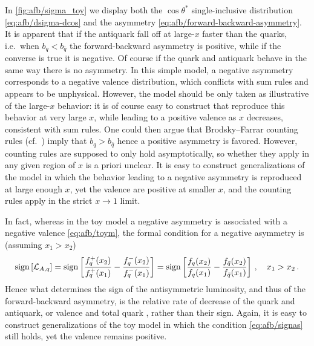 In \cref{fig:afb/sigma_toy} we display both the $\cos\theta^*$ single-inclusive
distribution \cref{eq:afb/dsigma-dcos} and the asymmetry
\cref{eq:afb/forward-backward-asymmetry}.
%
It is apparent that if the  antiquark \pdfs fall off at large-$x$ faster than
the quarks, i.e.\ when $b_q < b_{\bar{q}}$ the forward-backward asymmetry is
positive, while if the converse is true it is negative.
Of course if the quark and antiquark \pdfs behave in the same way there is no
asymmetry.
%
In this simple model, a negative asymmetry corresponds to a negative valence
distribution, which conflicts with sum rules and appears to be unphysical.
However, the model should be only taken as illustrative of the large-$x$
behavior: it is of course easy to construct \pdfs that reproduce this behavior
at very large $x$, while leading to a positive valence \pdf as $x$ decreases,
consistent with sum rules. 
One could then argue that Brodsky--Farrar counting rules (cf.\ 
\cite{Brodsky:1973kr,Brodsky:1974vy}) imply that  $b_q > b_{\bar{q}}$ hence a
positive asymmetry is favored.
%
However, counting rules are supposed to only hold asymptotically, so whether
they apply in any given region of $x$ is a priori unclear.
%
It is easy to construct generalizations of the model in which the behavior
leading to a negative asymmetry is reproduced at large enough $x$, yet the
valence \pdfs are positive at smaller $x$, and the counting rules apply in the
strict $x\to1$ limit.

In fact, whereas in the toy model a negative asymmetry is associated with a
negative valence \cref{eq:afb/toym}, the formal condition for a negative
asymmetry is (assuming $x_1>x_2$)
\begin{equation}\label{eq:afb/signas}
   \operatorname{sign}\left[\mathcal{L}_{A,q}\right]=\operatorname{sign}\left[\frac{ f_q^+(x_2)}{
       f_q^+(x_1)}-\frac{
       f_q^-(x_2)}{f_q^-(x_1)}\right]=\operatorname{sign}\left[\frac{ f_q(x_2)}{
       f_q(x_1)}-\frac{f_{\bar{q}}(x_2)}{f_{\bar{q}}(x_1)}\right] \, , \quad x_1>x_2 \,.
\end{equation}
Hence what determines the sign of the antisymmetric luminosity, and thus of the
forward-backward asymmetry, is the relative rate of decrease of the quark and
antiquark, or valence and total quark \pdfs, rather than their sign.
Again, it is easy to construct generalizations of the toy model in which the
condition \cref{eq:afb/signas} still holds, yet the valence \pdf remains
positive.

